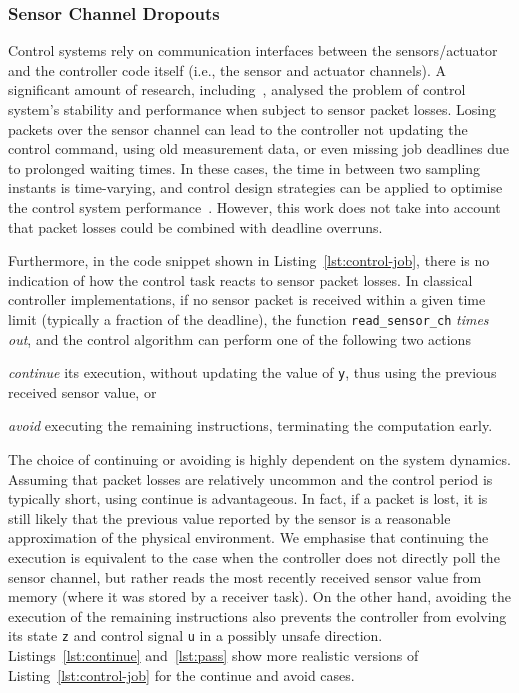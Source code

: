 \subsubsection*{Sensor Channel Dropouts}
Control systems rely on communication interfaces between the sensors/actuator and the controller code itself (i.e., the sensor and actuator channels).
A significant amount of research, including~\cite{Ling:2002, Linsenmayer:2017, Kauer:2014, Goswami:2014}, analysed the problem of control system's stability and performance when subject to sensor packet losses.
Losing packets over the sensor channel can lead to the controller not updating the control command, using old measurement data, or even missing job deadlines due to prolonged waiting times.
In these cases, the time in between two sampling instants is time-varying, and control design strategies can be applied to optimise the control system performance~\cite{Ghosh:2018, Schinkel:2002}.
However, this work does not take into account that packet losses could be combined with deadline overruns.

Furthermore, in the code snippet shown in Listing~\ref{lst:control-job}, there is no indication of how the control task reacts to sensor packet losses.
In classical controller implementations, if no sensor packet is received within a given time limit (typically a fraction of the deadline), the function \texttt{read\_sensor\_ch} \emph{times out}, and the control algorithm can perform one of the following two actions
%
\begin{enumerate*}[label=(\roman*)]
    \item \emph{continue} its execution, without updating the value of \texttt{y}, thus using the previous received sensor value, or
    \item \emph{avoid} executing the remaining instructions, terminating the computation early.
\end{enumerate*}

The choice of continuing or avoiding is highly dependent on the system dynamics.
Assuming that packet losses are relatively uncommon and the control period is typically short, using continue is advantageous.
In fact, if a packet is lost, it is still likely that the previous value reported by the sensor is a reasonable approximation of the physical environment.
We emphasise that continuing the execution is equivalent to the case when the controller does not directly poll the sensor channel, but rather reads the most recently received sensor value from memory (where it was stored by a receiver task).
On the other hand, avoiding the execution of the remaining instructions also prevents the controller from evolving its state \texttt{z} and control signal \texttt{u} in a possibly unsafe direction.
Listings~\ref{lst:continue} and~\ref{lst:pass} show more realistic versions of Listing~\ref{lst:control-job} for the continue and avoid cases.

